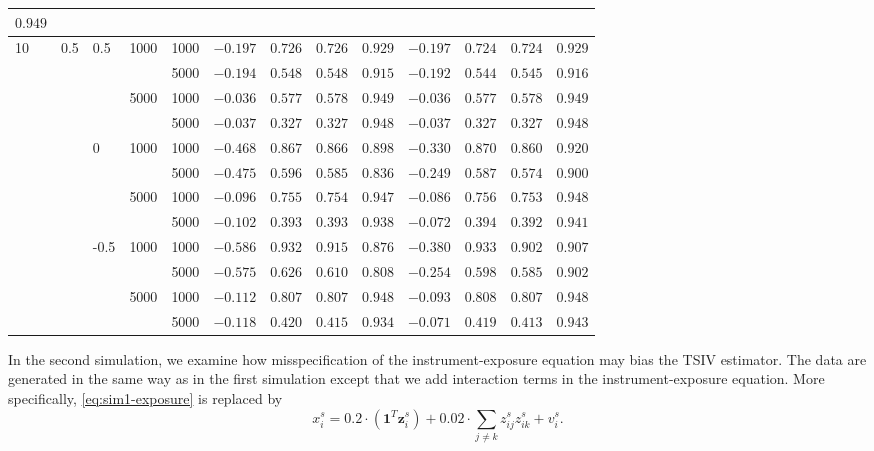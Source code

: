 \documentclass[preprint]{imsart}
\begin{document}
\begin{table}[t]
\begin{tabular}{|lllll|rrrr|rrrr|}
    $0.949$ \\
    \hline
    10 & 0.5 & 0.5 & 1000 & 1000  & $-0.197$ & $0.726$ & $0.726$ & $0.929$ & $-0.197$ & $0.724$ & $0.724$ & $0.929$ \\
    &  &  &  & 5000  & $-0.194$ & $0.548$ & $0.548$ & $0.915$ & $-0.192$ & $0.544$ & $0.545$ & $0.916$ \\
    &  &  & 5000 & 1000  & $-0.036$ & $0.577$ & $0.578$ & $0.949$ & $-0.036$ & $0.577$ & $0.578$ & $0.949$ \\
    &  &  &  & 5000  & $-0.037$ & $0.327$ & $0.327$ & $0.948$ & $-0.037$ & $0.327$ & $0.327$ & $0.948$ \\
    &  & 0 & 1000 & 1000  & $-0.468$ & $0.867$ & $0.866$ & $0.898$ & $-0.330$ & $0.870$ & $0.860$ & $0.920$ \\
    &  &  &  & 5000  & $-0.475$ & $0.596$ & $0.585$ & $0.836$ & $-0.249$ & $0.587$ & $0.574$ & $0.900$ \\
    &  &  & 5000 & 1000  & $-0.096$ & $0.755$ & $0.754$ & $0.947$ & $-0.086$ & $0.756$ & $0.753$ & $0.948$ \\
    &  &  &  & 5000  & $-0.102$ & $0.393$ & $0.393$ & $0.938$ & $-0.072$ & $0.394$ & $0.392$ & $0.941$ \\
    &  & -0.5 & 1000 & 1000  & $-0.586$ & $0.932$ & $0.915$ & $0.876$ & $-0.380$ & $0.933$ & $0.902$ & $0.907$ \\
    &  &  &  & 5000  & $-0.575$ & $0.626$ & $0.610$ & $0.808$ & $-0.254$ & $0.598$ & $0.585$ & $0.902$ \\
    &  &  & 5000 & 1000  & $-0.112$ & $0.807$ & $0.807$ & $0.948$ & $-0.093$ & $0.808$ & $0.807$ & $0.948$ \\
    &  &  &  & 5000  & $-0.118$ & $0.420$ & $0.415$ & $0.934$ & $-0.071$ & $0.419$ & $0.413$ & $0.943$ \\
    \hline
  \end{tabular}
\end{table}

In the second simulation, we examine how misspecification of the
instrument-exposure equation may bias the TSIV estimator. The data are
generated in the same way as in the first simulation except that we
add interaction terms in the instrument-exposure equation. More
specifically, \eqref{eq:sim1-exposure} is replaced by
\begin{equation}
  x_i^s = 0.2 \cdot (\mathbf{1}^T \mathbf{z}_i^s) + 0.02 \cdot
  \sum_{j \ne k} z_{ij}^s z_{ik}^s + v_i^s. \label{eq:sim2-exposure}
\end{equation}
\end{document}
